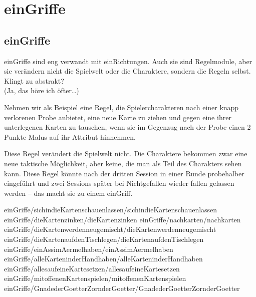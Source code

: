 \part {einGriffe}
\chapter {einGriffe}

einGriffe sind eng verwandt mit einRichtungen. Auch sie sind Regelmodule, aber sie verändern nicht die Spielwelt oder die Charaktere, sondern die Regeln selbst. Klingt zu abstrakt?\\
(Ja, das höre ich öfter\dots)

Nehmen wir als Beispiel eine Regel, die Spielercharakteren nach einer knapp verlorenen Probe anbietet, eine neue Karte zu ziehen und gegen eine ihrer unterlegenen Karten zu tauschen, wenn sie im Gegenzug nach der Probe einen 2 Punkte Malus auf ihr Attribut hinnehmen.

Diese Regel verändert die Spielwelt nicht. Die Charaktere bekommen zwar eine neue taktische Möglichkeit, aber keine, die man als Teil des Charakters sehen kann. Diese Regel könnte nach der dritten Session in einer Runde probehalber eingeführt und zwei Sessions später bei Nichtgefallen wieder fallen gelassen werden -- das macht sie zu einem einGriff.

 {einGriffe/sichindieKartenschauenlassen/sichindieKartenschauenlassen}
 {einGriffe/dieKartenzinken/dieKartenzinken}
 {einGriffe/nachkarten/nachkarten}
 {einGriffe/dieKartenwerdenneugemischt/dieKartenwerdenneugemischt}
 {einGriffe/dieKartenaufdenTischlegen/dieKartenaufdenTischlegen}
 {einGriffe/einAssimAermelhaben/einAssimAermelhaben}
 {einGriffe/alleKarteninderHandhaben/alleKarteninderHandhaben}
 {einGriffe/allesaufeineKartesetzen/allesaufeineKartesetzen}
 {einGriffe/mitoffenenKartenspielen/mitoffenenKartenspielen}
 {einGriffe/GnadederGoetterZornderGoetter/GnadederGoetterZornderGoetter}
